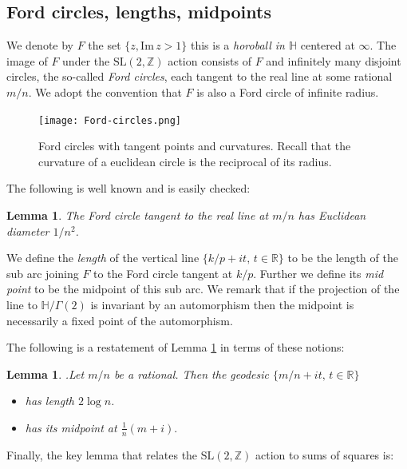 \documentclass[12pt,a4paper]{amsart}
\newtheorem{lem}[thm]{Lemma}
\def\HH{\mathbb{H}}
\def\im{\mathrm{Im}\,}
\def\xx{\HH/g2}
\def\ZZ{\mathbb{Z}}
\def\RR{\mathbb{R}}
\def\sl2{\mathrm{SL}(2, \ZZ)}
\def\g2{\Gamma(2)}
\def\xx{\HH/\g2}
\begin{document}
\subsection{Ford circles, lengths, midpoints} 
\label{lengths}

We denote by $F$ the set  $\{ z, \im z > 1\}$
this is a \textit{horoball in $\HH$} centered at $\infty$.
The image of $F$ under the $\sl2$ action consists of
$F$ and infinitely many disjoint circles, the so-called \textit{Ford circles}, 
each tangent to the real line at some rational $m/n$.
We adopt the convention that $F$ is also a Ford circle of infinite radius.

  \begin{figure}[ht]
\begin{center}
\texttt{[image: Ford-circles.png]} 
\end{center}
\caption{Ford circles with tangent points and curvatures.
Recall that the curvature of a euclidean circle is the reciprocal of its radius.}
\end{figure}

The following is well known and is easily checked:

\begin{lem}\label{ford}
The Ford circle tangent to the real line at $m/n$
has Euclidean diameter $1/n^2$.
\end{lem}


We define the \textit{length} of the vertical line 
$\{ k/p + i t,\, t \in \RR \}$
to be the length of the  sub arc joining 
$F$ to the Ford circle tangent at $k/p$.
Further we define its  \textit{mid point} to be the midpoint of this sub arc.
We remark that if the projection of the line to $\xx$
is invariant by an automorphism 
then the midpoint is necessarily a fixed point of the automorphism.

The following is a restatement of Lemma \ref{ford} in terms of these notions:

\begin{lem}.\label{calcul}
Let $m/n$ be a rational. 
Then the geodesic $\{ m/n + i t,\, t \in \RR \}$
\begin{itemize}
\item has  length $2\log n$. 
\item has its midpoint at $ \frac{1 }{n}(m + i).$
\end{itemize}
\end{lem}

Finally, the key lemma that relates the $\sl2$ action to sums of squares is:
\end{document}
